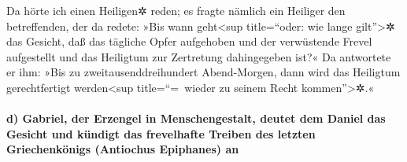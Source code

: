 Da hörte ich einen Heiligen✲ reden; es fragte nämlich ein
Heiliger den betreffenden, der da redete: »Bis wann geht\textless sup
title=``oder: wie lange gilt''\textgreater✲ das Gesicht, daß das
tägliche Opfer aufgehoben und der verwüstende Frevel aufgestellt und das
Heiligtum zur Zertretung dahingegeben ist?« Da antwortete
er ihm: »Bis zu zweitausenddreihundert Abend-Morgen, dann wird das
Heiligtum gerechtfertigt werden\textless sup title=``=~wieder zu seinem
Recht kommen''\textgreater✲.«

\hypertarget{d-gabriel-der-erzengel-in-menschengestalt-deutet-dem-daniel-das-gesicht-und-kuxfcndigt-das-frevelhafte-treiben-des-letzten-griechenkuxf6nigs-antiochus-epiphanes-an}{%
\paragraph{d) Gabriel, der Erzengel in Menschengestalt, deutet dem
Daniel das Gesicht und kündigt das frevelhafte Treiben des letzten
Griechenkönigs (Antiochus Epiphanes)
an}\label{d-gabriel-der-erzengel-in-menschengestalt-deutet-dem-daniel-das-gesicht-und-kuxfcndigt-das-frevelhafte-treiben-des-letzten-griechenkuxf6nigs-antiochus-epiphanes-an}}

